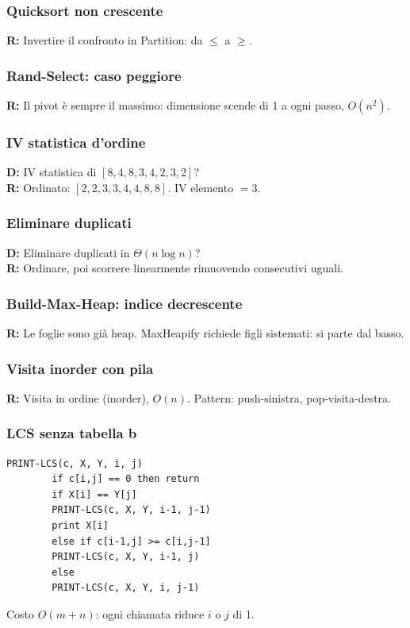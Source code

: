 \documentclass[a4paper, 11pt]{article}
\theoremstyle{definition}
\theoremstyle{remark}
\theoremstyle{remark}
\begin{document}
	\subsubsection*{Quicksort non crescente}
	\textbf{R:} Invertire il confronto in Partition: da $\le$ a $\ge$.
	
	\subsubsection*{Rand-Select: caso peggiore}
	\textbf{R:} Il pivot è sempre il massimo: dimensione scende di 1 a ogni
	passo, $O(n^2)$.
	
	\subsubsection*{\texorpdfstring{IV statistica d'ordine}{IV statistica d'ordine}}
	\textbf{D:} IV statistica di $[8,4,8,3,4,2,3,2]$?\\
	\textbf{R:} Ordinato: $[2,2,3,3,4,4,8,8]$. IV elemento $= 3$.
	
	\subsubsection*{Eliminare duplicati}
	\textbf{D:} Eliminare duplicati in $\Theta(n\log n)$?\\
	\textbf{R:} Ordinare, poi scorrere linearmente rimuovendo consecutivi uguali.
	
	\subsubsection*{Build-Max-Heap: indice decrescente}
	\textbf{R:} Le foglie sono già heap. MaxHeapify richiede figli sistemati:
	si parte dal basso.
	
	\subsubsection*{Visita inorder con pila}
	\textbf{R:} Visita in ordine (inorder), $O(n)$.
	Pattern: push-sinistra, pop-visita-destra.
	
	\subsubsection*{LCS senza tabella b}
	\begin{lstlisting}[language={}, numbers=none, frame=none,
		backgroundcolor=\color{white}, basicstyle=\ttfamily\footnotesize]
		PRINT-LCS(c, X, Y, i, j)
		if c[i,j] == 0 then return
		if X[i] == Y[j]
		PRINT-LCS(c, X, Y, i-1, j-1)
		print X[i]
		else if c[i-1,j] >= c[i,j-1]
		PRINT-LCS(c, X, Y, i-1, j)
		else
		PRINT-LCS(c, X, Y, i, j-1)
	\end{lstlisting}
	Costo $O(m+n)$: ogni chiamata riduce $i$ o $j$ di 1.
	
\end{document}
